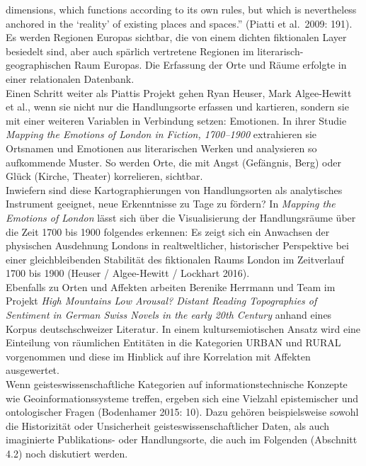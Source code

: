 \documentclass[
  12pt,
  letterpaper,
  DIV=11,
  numbers=noendperiod]{scrreprt}
\begin{document}
dimensions, which functions according to its own rules, but which is
nevertheless anchored in the `reality' of existing places and spaces.''
(Piatti et al.~2009: 191). Es werden Regionen Europas sichtbar, die von
einem dichten fiktionalen Layer besiedelt sind, aber auch spärlich
vertretene Regionen im literarisch-geographischen Raum Europas. Die
Erfassung der Orte und Räume erfolgte in einer relationalen Datenbank.\\
Einen Schritt weiter als Piattis Projekt gehen Ryan Heuser, Mark
Algee-Hewitt et al., wenn sie nicht nur die Handlungsorte erfassen und
kartieren, sondern sie mit einer weiteren Variablen in Verbindung
setzen: Emotionen. In ihrer Studie \emph{Mapping the Emotions of London
in Fiction, 1700--1900} extrahieren sie Ortsnamen und Emotionen aus
literarischen Werken und analysieren so aufkommende Muster. So werden
Orte, die mit Angst (Gefängnis, Berg) oder Glück (Kirche, Theater)
korrelieren, sichtbar.\\
Inwiefern sind diese Kartographierungen von Handlungsorten als
analytisches Instrument geeignet, neue Erkenntnisse zu Tage zu fördern?
In \emph{Mapping the Emotions of London} lässt sich über die
Visualisierung der Handlungsräume über die Zeit 1700 bis 1900 folgendes
erkennen: Es zeigt sich ein Anwachsen der physischen Ausdehnung Londons
in realtweltlicher, historischer Perspektive bei einer gleichbleibenden
Stabilität des fiktionalen Raums London im Zeitverlauf 1700 bis 1900
(Heuser / Algee-Hewitt / Lockhart 2016).\\
Ebenfalls zu Orten und Affekten arbeiten Berenike Herrmann und Team im
Projekt \emph{High Mountains Low Arousal? Distant Reading Topographies
of Sentiment in German Swiss Novels in the early 20th Century} anhand
eines Korpus deutschschweizer Literatur\emph{.} In einem
kultursemiotischen Ansatz wird eine Einteilung von räumlichen Entitäten
in die Kategorien URBAN und RURAL vorgenommen und diese im Hinblick auf
ihre Korrelation mit Affekten ausgewertet.\\
Wenn geisteswissenschaftliche Kategorien auf informationstechnische
Konzepte wie Geoinformationssysteme treffen, ergeben sich eine Vielzahl
epistemischer und ontologischer Fragen (Bodenhamer 2015: 10). Dazu
gehören beispielsweise sowohl die Historizität oder Unsicherheit
geisteswissenschaftlicher Daten, als auch imaginierte Publikations- oder
Handlungsorte, die auch im Folgenden (Abschnitt 4.2) noch diskutiert
werden.
\end{document}
